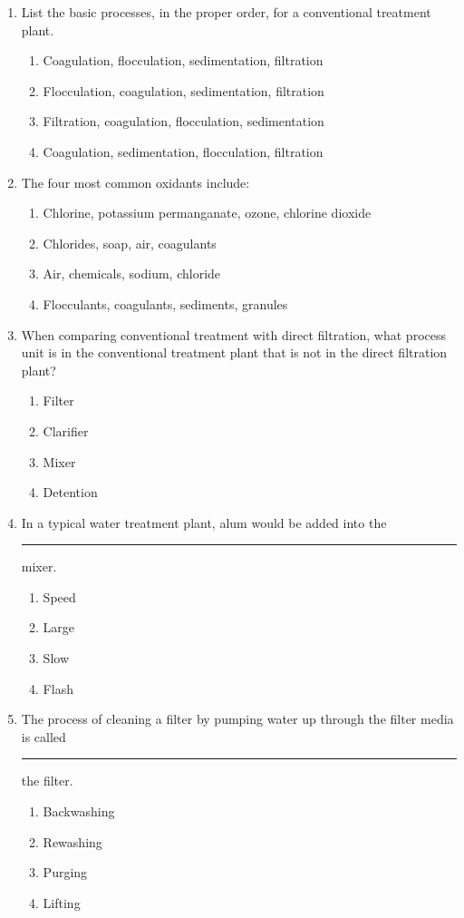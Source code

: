 \begin{enumerate}
\item List the basic processes, in the proper order, for a conventional treatment plant.
\begin{enumerate}
\item Coagulation, flocculation, sedimentation, filtration
\item Flocculation, coagulation, sedimentation, filtration
\item Filtration, coagulation, flocculation, sedimentation
\item Coagulation, sedimentation, flocculation, filtration
\end{enumerate}

\item The four most common oxidants include:
\begin{enumerate}
\item Chlorine, potassium permanganate, ozone, chlorine dioxide
\item Chlorides, soap, air, coagulants
\item Air, chemicals, sodium, chloride
\item Flocculants, coagulants, sediments, granules
\end{enumerate}

\item When comparing conventional treatment with direct filtration, what process unit is in the conventional treatment plant that is not in the direct filtration plant?
\begin{enumerate}
\item Filter
\item Clarifier
\item Mixer
\item Detention
\end{enumerate}

\item In a typical water treatment plant, alum would be added into the \rule{1cm}{0.5pt}  mixer.
\begin{enumerate}
\item Speed
\item Large
\item Slow
\item Flash
\end{enumerate}

\item The process of cleaning a filter by pumping water up through the filter media is called \rule{1cm}{0.5pt}  the filter.
\begin{enumerate}
\item Backwashing
\item Rewashing
\item Purging
\item Lifting
\end{enumerate}


\end{enumerate}
